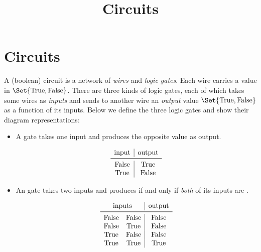 \documentclass{report-snippet}
\title{Circuits}
\begin{document}
\section{Circuits}

A (boolean) circuit is a network of \emph{wires} and \emph{logic gates}.  Each
wire carries a value in \(\Set{\True,\False}\).  There are three kinds of logic
gates, each of which takes some wires as \emph{inputs} and sends to another
wire an \emph{output} value \(\Set{\True,\False}\) as a function of its inputs.
Below we define the three logic gates and show their diagram representations:
\begin{itemize}

  \item A \NOT{} gate takes one input and produces the opposite value as
    output.

    \begin{center}
    \end{center}
    \[
      \begin{array}{c|c}
        \text{input} & \text{output} \\ \midrule
        \False & \True \\
        \True & \False
      \end{array}
    \]

  \item An \AND{} gate takes two inputs and produces \True{} if and only if
    \emph{both} of its inputs are \True.

    \begin{center}
    \end{center}
    \[
      \begin{array}{cc|c}
        \multicolumn{2}{c|}{\text{inputs}} & \text{output} \\ \midrule
        \False & \False & \False \\
        \False & \True & \False \\
        \True & \False & \False \\
        \True & \True & \True
      \end{array}
    \]


\end{itemize}
\end{document}
